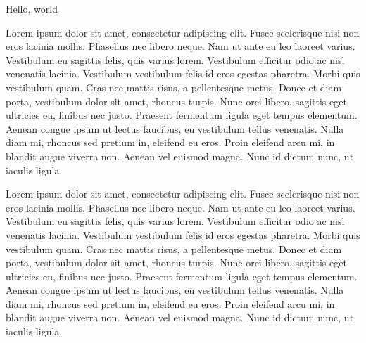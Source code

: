 \documentclass{article}
\newenvironment{Narrator}
               {\begin{tcolorbox}[enhanced,
                     breakable,
                     parbox=false,
                     colback=narrator-bg,
                     colframe=narrator-frame,
                     attach boxed title to top left={xshift=5mm,
                       yshift=-3mm,
                       yshifttext=-1mm},
                     coltitle=black,
                     colbacktitle=narrator-title-bg,
                     title=Narrator,
                     boxed title style={size=small,
                       colframe=black}]}
               {\end{tcolorbox}}
\begin{document}
\begin{Narrator}
  
Hello, world

Lorem ipsum dolor sit amet, consectetur adipiscing elit. Fusce scelerisque nisi non eros lacinia mollis. Phasellus nec libero neque. Nam ut ante eu leo laoreet varius. Vestibulum eu sagittis felis, quis varius lorem. Vestibulum efficitur odio ac nisl venenatis lacinia. Vestibulum vestibulum felis id eros egestas pharetra. Morbi quis vestibulum quam. Cras nec mattis risus, a pellentesque metus. Donec et diam porta, vestibulum dolor sit amet, rhoncus turpis. Nunc orci libero, sagittis eget ultricies eu, finibus nec justo. Praesent fermentum ligula eget tempus elementum. Aenean congue ipsum ut lectus faucibus, eu vestibulum tellus venenatis. Nulla diam mi, rhoncus sed pretium in, eleifend eu eros. Proin eleifend arcu mi, in blandit augue viverra non. Aenean vel euismod magna. Nunc id dictum nunc, ut iaculis ligula.

Lorem ipsum dolor sit amet, consectetur adipiscing elit. Fusce scelerisque nisi non eros lacinia mollis. Phasellus nec libero neque. Nam ut ante eu leo laoreet varius. Vestibulum eu sagittis felis, quis varius lorem. Vestibulum efficitur odio ac nisl venenatis lacinia. Vestibulum vestibulum felis id eros egestas pharetra. Morbi quis vestibulum quam. Cras nec mattis risus, a pellentesque metus. Donec et diam porta, vestibulum dolor sit amet, rhoncus turpis. Nunc orci libero, sagittis eget ultricies eu, finibus nec justo. Praesent fermentum ligula eget tempus elementum. Aenean congue ipsum ut lectus faucibus, eu vestibulum tellus venenatis. Nulla diam mi, rhoncus sed pretium in, eleifend eu eros. Proin eleifend arcu mi, in blandit augue viverra non. Aenean vel euismod magna. Nunc id dictum nunc, ut iaculis ligula.

\end{Narrator}
\end{document}
